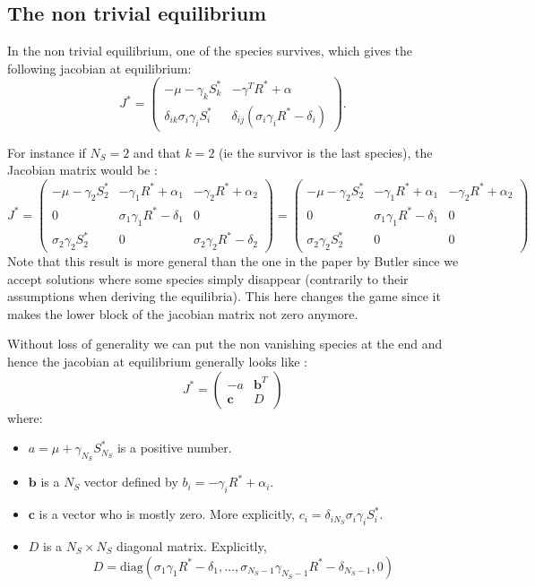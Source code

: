 \documentclass[12pt]{article}
\newcommand{\vect}[1]{\textbf{#1}}
\begin{document}
\begin{appendices}
		\subsection{The non trivial equilibrium}
	In the non trivial equilibrium, one of the species survives, which gives the following jacobian at equilibrium:
	\begin{equation}
		J^* = 
		\begin{pmatrix}
			-\mu-\gamma_k S^*_k & -\gamma^T R^*+\alpha \\
			\delta_{ik} \sigma_i \gamma_i S^*_i & \delta_{ij}(\sigma_i \gamma_i R^*-\delta_i)
		\end{pmatrix}.
	\end{equation}

	For instance if $N_S=2$ and that $k=2$ (ie the survivor is the last species), the Jacobian matrix would be :
	\begin{equation}
		J^* =
		\begin{pmatrix}
			-\mu-\gamma_2 S^*_2 & -\gamma_1 R^* + \alpha_1 & -\gamma_2 R^* +\alpha_2 \\
			0 & \sigma_1 \gamma_1 R^*-\delta_1 & 0 \\
			\sigma_2 \gamma_2 S^*_2 & 0 & \sigma_2 \gamma_2 R^* - \delta_2 
		\end{pmatrix}
		=
		\begin{pmatrix}
			-\mu-\gamma_2 S^*_2 & -\gamma_1 R^* + \alpha_1 & -\gamma_2 R^* +\alpha_2 \\
			0 & \sigma_1 \gamma_1 R^*-\delta_1 & 0 \\
			\sigma_2 \gamma_2 S^*_2 & 0 & 0 
		\end{pmatrix}
	\end{equation}
	Note that this result is more general than the one in the paper by Butler since we accept solutions where some species simply disappear (contrarily to their assumptions when deriving the equilibria). This here changes the game since it makes the lower block of the jacobian matrix not zero anymore.

	Without loss of generality we can put the non vanishing species at the end and hence the jacobian at equilibrium generally looks like :
	\begin{equation}
		J^* = 
		\begin{pmatrix}
			-a & \vect{b}^T \\
			\vect{c} & D 
		\end{pmatrix}
	\end{equation}
	where:
	\begin{itemize}
		\item $a = \mu+\gamma_{N_S} S^*_{N_S}$ is a positive number.
		\item $\vect{b}$ is a $N_S$ vector defined by $b_i = - \gamma_i R^* + \alpha_i$.
		\item $\vect{c}$ is a vector who is mostly zero. More explicitly, $c_i = \delta_{iN_S} \sigma_i \gamma_i S^*_i$.
		\item $D$ is a $N_S \times N_S$ diagonal matrix. Explicitly, 
		$$D = \text{diag}(\sigma_1 \gamma_1 R^*-\delta_1, \dots,\sigma_{N_S-1} \gamma_{N_S-1} R^*-\delta_{N_S-1}, 0)$$
	\end{itemize}

\end{appendices}
\end{document}
